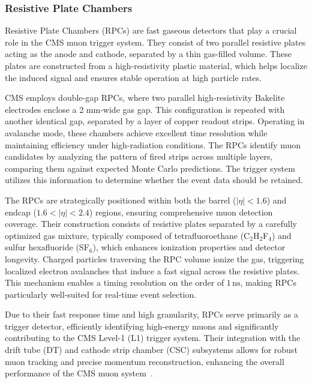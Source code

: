 \subsubsection{Resistive Plate Chambers}

Resistive Plate Chambers (RPCs) are fast gaseous detectors that play a crucial role in the CMS muon trigger system. They consist of two parallel resistive plates acting as the anode and cathode, separated by a thin gas-filled volume. These plates are constructed from a high-resistivity plastic material, which helps localize the induced signal and ensures stable operation at high particle rates.  

CMS employs double-gap RPCs, where two parallel high-resistivity Bakelite electrodes enclose a 2 mm-wide gas gap. This configuration is repeated with another identical gap, separated by a layer of copper readout strips. Operating in avalanche mode, these chambers achieve excellent time resolution while maintaining efficiency under high-radiation conditions. The RPCs identify muon candidates by analyzing the pattern of fired strips across multiple layers, comparing them against expected Monte Carlo predictions. The trigger system utilizes this information to determine whether the event data should be retained.  

The RPCs are strategically positioned within both the barrel ($|\eta| < 1.6$) and endcap ($1.6 < |\eta| < 2.4$) regions, ensuring comprehensive muon detection coverage. Their construction consists of resistive plates separated by a carefully optimized gas mixture, typically composed of tetrafluoroethane (C$_2$H$_2$F$_4$) and sulfur hexafluoride (SF$_6$), which enhances ionization properties and detector longevity. Charged particles traversing the RPC volume ionize the gas, triggering localized electron avalanches that induce a fast signal across the resistive plates. This mechanism enables a timing resolution on the order of $1\,\mathrm{ns}$, making RPCs particularly well-suited for real-time event selection.  

Due to their fast response time and high granularity, RPCs serve primarily as a trigger detector, efficiently identifying high-energy muons and significantly contributing to the CMS Level-1 (L1) trigger system. Their integration with the drift tube (DT) and cathode strip chamber (CSC) subsystems allows for robust muon tracking and precise momentum reconstruction, enhancing the overall performance of the CMS muon system~\cite{CMS:MuonTDR, Eysermans_2017}.  


